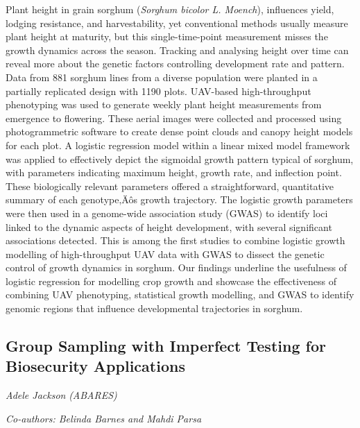 \documentclass[
]{scrreprt}
\begin{document}
Plant height in grain sorghum (\emph{Sorghum bicolor L. Moench}),
influences yield, lodging resistance, and harvestability, yet
conventional methods usually measure plant height at maturity, but this
single-time-point measurement misses the growth dynamics across the
season. Tracking and analysing height over time can reveal more about
the genetic factors controlling development rate and pattern. Data from
881 sorghum lines from a diverse population were planted in a partially
replicated design with 1190 plots. UAV-based high-throughput phenotyping
was used to generate weekly plant height measurements from emergence to
flowering. These aerial images were collected and processed using
photogrammetric software to create dense point clouds and canopy height
models for each plot. A logistic regression model within a linear mixed
model framework was applied to effectively depict the sigmoidal growth
pattern typical of sorghum, with parameters indicating maximum height,
growth rate, and inflection point. These biologically relevant
parameters offered a straightforward, quantitative summary of each
genotype‚Äôs growth trajectory. The logistic growth parameters were then
used in a genome-wide association study (GWAS) to identify loci linked
to the dynamic aspects of height development, with several significant
associations detected. This is among the first studies to combine
logistic growth modelling of high-throughput UAV data with GWAS to
dissect the genetic control of growth dynamics in sorghum. Our findings
underline the usefulness of logistic regression for modelling crop
growth and showcase the effectiveness of combining UAV phenotyping,
statistical growth modelling, and GWAS to identify genomic regions that
influence developmental trajectories in sorghum.

\subsection{Group Sampling with Imperfect Testing for Biosecurity
Applications}\label{group-sampling-with-imperfect-testing-for-biosecurity-applications}

\emph{Adele Jackson} \emph{(ABARES)}

\emph{Co-authors: Belinda Barnes and Mahdi Parsa}

\setlength{\parskip}{0.5em}
\end{document}
